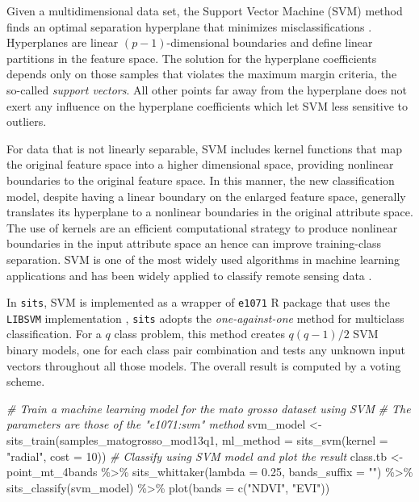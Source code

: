 \documentclass[a4paper,]{tufte-book}
\newenvironment{Shaded}{}{}
\newcommand{\AttributeTok}[1]{\textcolor[rgb]{0.49,0.56,0.16}{#1}}
\newcommand{\CommentTok}[1]{\textcolor[rgb]{0.38,0.63,0.69}{\textit{#1}}}
\newcommand{\DecValTok}[1]{\textcolor[rgb]{0.25,0.63,0.44}{#1}}
\newcommand{\FloatTok}[1]{\textcolor[rgb]{0.25,0.63,0.44}{#1}}
\newcommand{\FunctionTok}[1]{\textcolor[rgb]{0.02,0.16,0.49}{#1}}
\newcommand{\NormalTok}[1]{#1}
\newcommand{\OtherTok}[1]{\textcolor[rgb]{0.00,0.44,0.13}{#1}}
\newcommand{\SpecialCharTok}[1]{\textcolor[rgb]{0.25,0.44,0.63}{#1}}
\newcommand{\StringTok}[1]{\textcolor[rgb]{0.25,0.44,0.63}{#1}}
\begin{document}
Given a multidimensional data set, the Support Vector Machine (SVM) method finds an optimal separation hyperplane that minimizes misclassifications \citep{Cortes1995}. Hyperplanes are linear \({(p-1)}\)-dimensional boundaries and define linear partitions in the feature space. The solution for the hyperplane coefficients depends only on those samples that violates the maximum margin criteria, the so-called \emph{support vectors}. All other points far away from the hyperplane does not exert any influence on the hyperplane coefficients which let SVM less sensitive to outliers.

For data that is not linearly separable, SVM includes kernel functions that map the original feature space into a higher dimensional space, providing nonlinear boundaries to the original feature space. In this manner, the new classification model, despite having a linear boundary on the enlarged feature space, generally translates its hyperplane to a nonlinear boundaries in the original attribute space. The use of kernels are an efficient computational strategy to produce nonlinear boundaries in the input attribute space an hence can improve training-class separation. SVM is one of the most widely used algorithms in machine learning applications and has been widely applied to classify remote sensing data \citep{Mountrakis2011}.

In \texttt{sits}, SVM is implemented as a wrapper of \texttt{e1071} R package that uses the \texttt{LIBSVM} implementation \citep{Chang2011}, \texttt{sits} adopts the \emph{one-against-one} method for multiclass classification. For a \(q\) class problem, this method creates \({q(q-1)/2}\) SVM binary models, one for each class pair combination and tests any unknown input vectors throughout all those models. The overall result is computed by a voting scheme.

\begin{Shaded}
\begin{Highlighting}[]
\CommentTok{\# Train a machine learning model for the mato grosso dataset using SVM}
\CommentTok{\# The parameters are those of the "e1071:svm" method}
\NormalTok{svm\_model }\OtherTok{\textless{}{-}} \FunctionTok{sits\_train}\NormalTok{(samples\_matogrosso\_mod13q1, }
                        \AttributeTok{ml\_method =} \FunctionTok{sits\_svm}\NormalTok{(}\AttributeTok{kernel =} \StringTok{"radial"}\NormalTok{,}
                                             \AttributeTok{cost =} \DecValTok{10}\NormalTok{))}
\CommentTok{\# Classify using SVM model and plot the result}
\NormalTok{class.tb }\OtherTok{\textless{}{-}}\NormalTok{ point\_mt\_4bands }\SpecialCharTok{\%\textgreater{}\%} 
    \FunctionTok{sits\_whittaker}\NormalTok{(}\AttributeTok{lambda =} \FloatTok{0.25}\NormalTok{, }\AttributeTok{bands\_suffix =} \StringTok{""}\NormalTok{) }\SpecialCharTok{\%\textgreater{}\%} 
    \FunctionTok{sits\_classify}\NormalTok{(svm\_model) }\SpecialCharTok{\%\textgreater{}\%} 
    \FunctionTok{plot}\NormalTok{(}\AttributeTok{bands =} \FunctionTok{c}\NormalTok{(}\StringTok{"NDVI"}\NormalTok{, }\StringTok{"EVI"}\NormalTok{))}
\end{Highlighting}
\end{Shaded}
\end{document}
